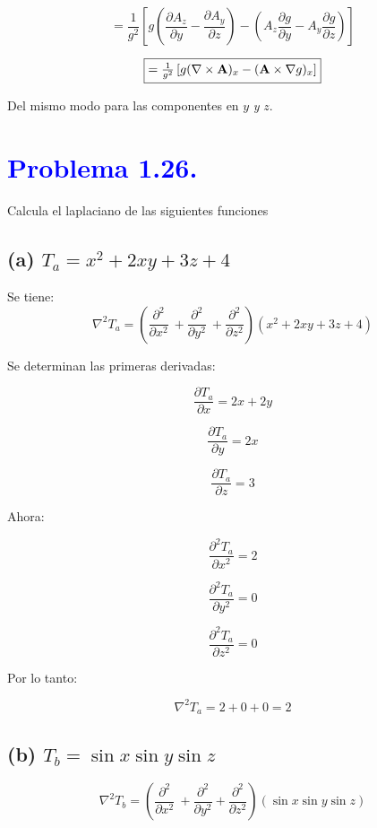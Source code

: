 \documentclass[12pt]{article}
\newcommand{\question}[1]{\textcolor{blue}{\textbf{#1}}}
\begin{document}
\[
= \frac{1}{g^2} \left[ g \left( \frac{\partial A_z}{\partial y} - \frac{\partial A_y}{\partial z} \right) - \left( A_z \frac{\partial g}{\partial y} - A_y \frac{\partial g}{\partial z} \right) \right]
\]

\[\fbox{$
= \frac{1}{g^2} \left[ g (\nabla \times \mathbf{A})_x - (\mathbf{A} \times \nabla g)_x \right] $}
\]

Del mismo modo para las componentes en \( y \) \textit{y} \( z \).



\section*{\question{Problema 1.26.}} Calcula el laplaciano de las siguientes funciones

\subsection*{(a) \( T_a = x^2 + 2xy + 3z + 4 \)}

Se tiene:
\[
\nabla^2 T_a = \left( \frac{\partial^2}{\partial x^2}\ + \frac{\partial^2}{\partial y^2}\ + \frac{\partial^2}{\partial z^2}  \right) (x^2 + 2xy + 3z + 4)
\]

Se determinan las primeras derivadas:

\[
\frac{\partial T_a}{\partial x} = 2x + 2y
\]

\[
\frac{\partial T_a}{\partial y} = 2x
\]

\[
\frac{\partial T_a}{\partial z} = 3
\]

Ahora:

\[
\frac{\partial^2 T_a}{\partial x^2} = 2
\]

\[
\frac{\partial^2 T_a}{\partial y^2} = 0
\]

\[
\frac{\partial^2 T_a}{\partial z^2} = 0
\]

Por lo tanto:

\[
\boxed{\nabla^2 T_a = 2 + 0 + 0 = 2}
\]

\subsection*{(b) \( T_b = \sin x \sin y \sin z \)}

\[
\nabla^2 T_b = \left( \frac{\partial^2}{\partial x^2}\ + \frac{\partial^2}{\partial y^2}+ \frac{\partial^2}{\partial z^2}  \right) ( \sin x \sin y \sin z )
\]
\end{document}
